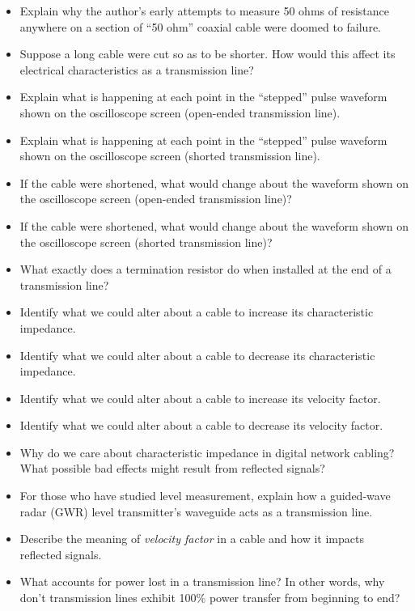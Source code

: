 \begin{itemize}
\item{} Explain why the author's early attempts to measure 50 ohms of resistance anywhere on a section of ``50 ohm'' coaxial cable were doomed to failure.
\item{} Suppose a long cable were cut so as to be shorter.  How would this affect its electrical characteristics as a transmission line?
\item{} Explain what is happening at each point in the ``stepped'' pulse waveform shown on the oscilloscope screen (open-ended transmission line).
\item{} Explain what is happening at each point in the ``stepped'' pulse waveform shown on the oscilloscope screen (shorted transmission line).
\item{} If the cable were shortened, what would change about the waveform shown on the oscilloscope screen (open-ended transmission line)?
\item{} If the cable were shortened, what would change about the waveform shown on the oscilloscope screen (shorted transmission line)?
\item{} What exactly does a termination resistor do when installed at the end of a transmission line?
\item{} Identify what we could alter about a cable to increase its characteristic impedance.
\item{} Identify what we could alter about a cable to decrease its characteristic impedance.
\item{} Identify what we could alter about a cable to increase its velocity factor.
\item{} Identify what we could alter about a cable to decrease its velocity factor.
\item{} Why do we care about characteristic impedance in digital network cabling?  What possible bad effects might result from reflected signals?
\item{} For those who have studied level measurement, explain how a guided-wave radar (GWR) level transmitter's waveguide acts as a transmission line.
\item{} Describe the meaning of {\it velocity factor} in a cable and how it impacts reflected signals.
\item{} What accounts for power lost in a transmission line?  In other words, why don't transmission lines exhibit 100\% power transfer from beginning to end?
\end{itemize}












